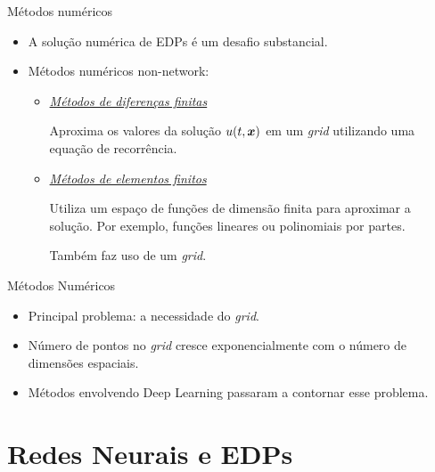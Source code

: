 \documentclass[13pt]{beamer}
\begin{document}
\begin{frame}{Métodos numéricos}
    \begin{itemize}
        \item<1-> A solução numérica de EDPs é um desafio substancial.
        \item<2-> Métodos numéricos non-network:
        \begin{itemize}
            \item<3-> \href{https://en.wikipedia.org/wiki/Finite_difference_method}{\emph{Métodos de diferenças finitas}}

                Aproxima os valores da solução \( u ( t, \bm{x} ) \) em um \emph{grid} utilizando uma equação de recorrência.

                \item<5-> \href{https://en.wikipedia.org/wiki/Finite_element_method}{\emph{Métodos de elementos finitos}}

                Utiliza um espaço de funções de dimensão finita para aproximar a solução.
                Por exemplo, funções lineares ou polinomiais por partes.

                Também faz uso de um \emph{grid}.
        \end{itemize}
    \end{itemize}
\end{frame}


\begin{frame}{Métodos Numéricos}
    \begin{itemize}
        \item<1-> Principal problema: a necessidade do \emph{grid}.
        \item<2-> Número de pontos no \emph{grid} cresce exponencialmente com o número de dimensões espaciais.
        \item<3-> Métodos envolvendo Deep Learning passaram a contornar esse problema.
    \end{itemize}
\end{frame}

\section{Redes Neurais e EDPs}
\end{document}
